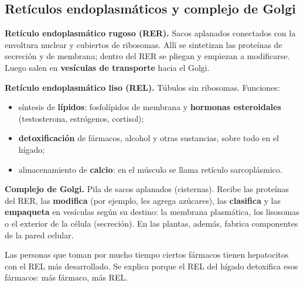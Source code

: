 \subsection{Retículos endoplasmáticos y complejo de Golgi}
\textbf{Retículo endoplasmático rugoso (RER).} Sacos aplanados conectados con la envoltura nuclear y cubiertos de ribosomas. Allí se sintetizan las proteínas de secreción y de membrana; dentro del RER se pliegan y empiezan a modificarse. Luego salen en \textbf{vesículas de transporte} hacia el Golgi.

 

\textbf{Retículo endoplasmático liso (REL).} Túbulos sin ribosomas. Funciones:

 
\begin{itemize}
  \item síntesis de \textbf{lípidos}: fosfolípidos de membrana y \textbf{hormonas esteroidales} (testosterona, estrógenos, cortisol);
  \item \textbf{detoxificación} de fármacos, alcohol y otras sustancias, sobre todo en el hígado;
  \item almacenamiento de \textbf{calcio}: en el músculo se llama retículo sarcoplásmico.
\end{itemize}
  

\textbf{Complejo de Golgi.} Pila de sacos aplanados (cisternas). Recibe las proteínas del RER, las \textbf{modifica} (por ejemplo, les agrega azúcares), las \textbf{clasifica} y las \textbf{empaqueta} en vesículas según su destino: la membrana plasmática, los lisosomas o el exterior de la célula (secreción). En las plantas, además, fabrica componentes de la pared celular.

 
\begin{ejemplo} Las personas que toman por mucho tiempo ciertos fármacos tienen hepatocitos con el REL más desarrollado. Se explica porque el REL del hígado detoxifica esos fármacos: más fármaco, más REL.\end{ejemplo}
